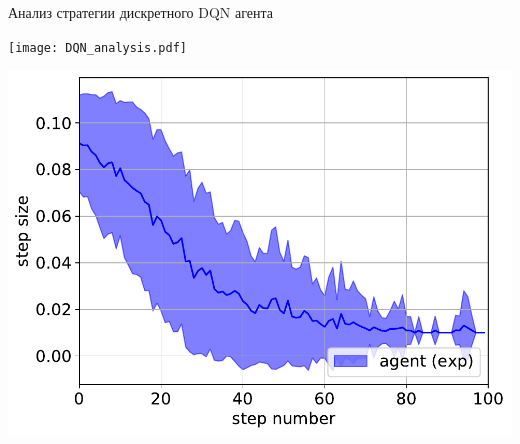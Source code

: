 \begin{frame}{Анализ стратегии дискретного DQN агента}

\begin{minipage}{\textwidth}
\texttt{[image: DQN\_analysis.pdf]}
\end{minipage}
\begin{minipage}{\textwidth}
\includegraphics[width=0.5\linewidth]{images/agent_step_size.pdf}
\end{minipage}
\end{frame}


